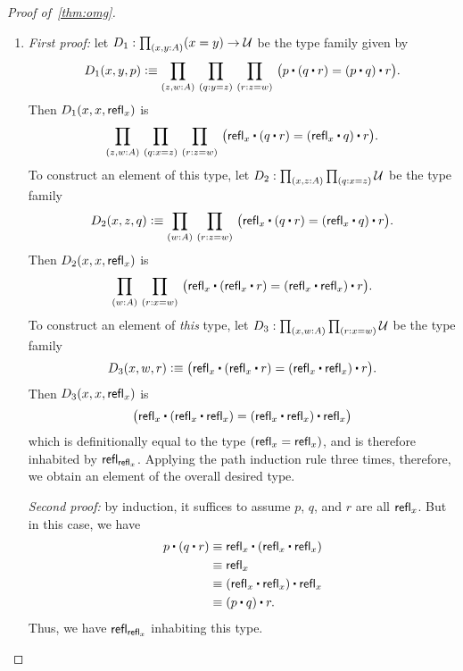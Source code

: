 \begin{proof}[Proof of~\autoref{thm:omg}]
\begin{enumerate}
  \item \emph{First proof:} let $D_1:\prd{x,y:A} (x=y) \to \type$ be the type family given by
    \begin{equation*}
      D_1(x,y,p)\defeq\prd{z,w:A}{q:y= z}{r:z= w} \big(p\ct (q\ct r)=  (p\ct q)\ct r\big).
    \end{equation*}
    Then $D_1(x,x,\mathsf{refl}_{x})$ is
    \begin{equation*}
      \prd{z,w:A}{q:x= z}{r:z= w} \big(\refl{x}\ct(q\ct r)= (\refl{x}\ct q)\ct r\big).
    \end{equation*}
    To construct an element of this type, let $D_2:\prd{x,z:A}{q:x=z} \type$ be the type family
    \begin{equation*}
      D_2 (x,z,q) \defeq \prd{w:A}{r:z=w} \big(\refl{x}\ct(q\ct r)= (\refl{x}\ct q)\ct r\big).
    \end{equation*}
    Then $D_2(x,x,\mathsf{refl}_{x})$ is
    \begin{equation*}
      \prd{w:A}{r:x=w} \big(\refl{x}\ct(\refl{x}\ct r)= (\refl{x}\ct \refl{x})\ct r\big).
    \end{equation*}
    To construct an element of \emph{this} type, let $D_3:\prd{x,w:A}{r:x=w} \type$ be the type family
    \begin{equation*}
      D_3(x,w,r) \defeq \big(\refl{x}\ct(\refl{x}\ct r)= (\refl{x}\ct \refl{x})\ct r\big).
    \end{equation*}
    Then $D_3(x,x,\mathsf{refl}_{x})$ is
    \begin{equation*}
      \big(\refl{x}\ct(\refl{x}\ct \refl{x})= (\refl{x}\ct \refl{x})\ct \refl{x}\big)
    \end{equation*}
    which is definitionally equal to the type $(\mathsf{refl}_{x} = \mathsf{refl}_{x})$, and is therefore inhabited by $\mathsf{refl}_{\mathsf{refl}_{x}}$.
    Applying the path induction rule three times, therefore, we obtain an element of the overall desired type.

    \mentalpause

    \noindent \emph{Second proof:} by induction, it suffices to assume $p$, $q$, and $r$ are all $\mathsf{refl}_{x}$.
    But in this case, we have
    \begin{align*}
      p\ct (q\ct r)
      &\jdeq \refl{x}\ct(\refl{x}\ct \refl{x})\\
      &\jdeq \refl{x}\\
      &\jdeq (\refl{x}\ct \refl x)\ct \refl x\\
      &\jdeq (p\ct q)\ct r.
    \end{align*}
    Thus, we have $\mathsf{refl}_{\mathsf{refl}_{x}}$ inhabiting this type. \qedhere
  \end{enumerate}
\end{proof}

